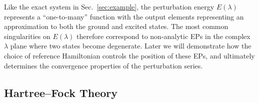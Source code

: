 \documentclass[aps,prb,reprint,noshowkeys,superscriptaddress]{revtex4-1}
\begin{document}
Like the exact system in Sec.~\ref{sec:example}, the perturbation energy $E(\lambda)$ represents
a ``one-to-many'' function with the output elements representing an approximation to both the ground and excited states.
The most common singularities on $E(\lambda)$ therefore correspond to non-analytic EPs in the complex 
$\lambda$ plane where two states become degenerate.
Later we will demonstrate how the choice of reference Hamiltonian controls the position of these EPs, and 
ultimately determines the convergence properties of the perturbation series.

\subsection{Hartree--Fock Theory}
\label{sec:HF}
\end{document}
